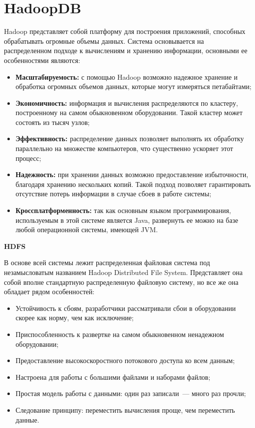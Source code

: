 \section{HadoopDB}
Hadoop  представляет собой платформу для построения приложений, способных обрабатывать огромные объемы данных. Система основывается на распределенном подходе к вычислениям и хранению информации, основными ее особенностями являются:

\begin{itemize}
  \item \textbf{Масштабируемость:} с помощью Hadoop возможно надежное хранение и обработка огромных объемов данных, которые могут измеряться петабайтами;
  \item \textbf{Экономичность:} информация и вычисления распределяются по кластеру, построенному на самом обыкновенном оборудовании. Такой кластер может состоять из тысяч узлов;
  \item \textbf{Эффективность:} распределение данных позволяет выполнять их обработку параллельно на множестве компьютеров, что существенно ускоряет этот процесс;
  \item \textbf{Надежность:} при хранении данных возможно предоставление избыточности, благодаря хранению нескольких копий. Такой подход позволяет гарантировать отсутствие потерь информации в случае сбоев в работе системы;
  \item \textbf{Кроссплатформенность:} так как основным языком программирования, используемым в этой системе является Java, развернуть ее можно на базе любой операционной системы, имеющей JVM.
\end{itemize}

\textbf{HDFS}

В основе всей системы лежит распределенная файловая система под незамысловатым названием Hadoop Distributed File System. Представляет она собой вполне стандартную распределенную файловую систему, но все же она обладает рядом особенностей:

\begin{itemize}
  \item Устойчивость к сбоям, разработчики рассматривали сбои в оборудовании скорее как норму, чем как исключение;
  \item Приспособленность к развертке на самом обыкновенном ненадежном оборудовании;
  \item Предоставление высокоскоростного потокового доступа ко всем данным;
  \item Настроена для работы с большими файлами и наборами файлов;
  \item Простая модель работы с данными: один раз записали~--- много раз прочли;
  \item Следование принципу: переместить вычисления проще, чем переместить данные.
\end{itemize}

